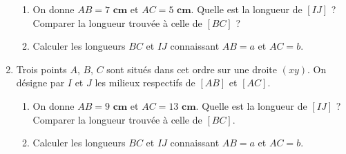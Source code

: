 \documentclass[12 pt]{report}
\theoremstyle{plain}
\newcounter{n}
\newcommand{\cm}{\textbf{ cm}}
\begin{document}
\begin{enumerate}
\begin{enumerate}
\item On donne $AB= 7\cm$ et $AC = 5\cm$. Quelle est la longueur de $[IJ]$ ? Comparer la longueur trouvée à celle de $[BC]$ ? 
\item Calculer les longueurs $BC$ et $IJ$ connaissant $AB = a$ et $AC = b$. 
\end{enumerate}
\item Trois points $A$, $B$, $C$ sont situés dans cet ordre sur une droite $(xy)$. On désigne par $I$ et $J$ les milieux respectifs de $[AB]$ et $[AC]$. \begin{enumerate}
\item On donne $AB=9\cm$ et $AC=13\cm$. Quelle est la longueur de $[IJ]$ ? Comparer la longueur trouvée à celle de $[BC]$. 
\item Calculer les longueurs $BC$ et $IJ$ connaissant $AB = a$ et $AC = b$. 
\end{enumerate}

\end{enumerate} 
\end{document}

